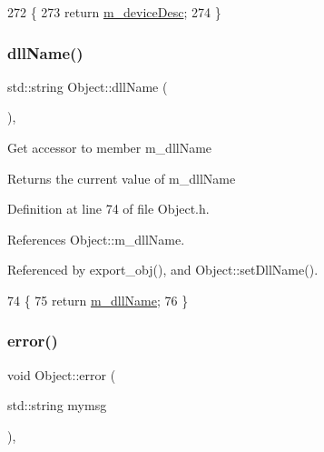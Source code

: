 \begin{DoxyCode}
272                           \{
273     \textcolor{keywordflow}{return} \hyperlink{classUsbFTInterface_a500067688c32cdb3719fecf128e88dca}{m\_deviceDesc};
274   \}
\end{DoxyCode}
\mbox{\label{classObject_a2e3947f2870094c332d7454117f3ec63}} 
\subsubsection{\texorpdfstring{dll\+Name()}{dllName()}}
{\footnotesize\ttfamily std\+::string Object\+::dll\+Name (\begin{DoxyParamCaption}{ }\end{DoxyParamCaption})\hspace{0.3cm}{\ttfamily [inline]}, {\ttfamily [inherited]}}

Get accessor to member m\+\_\+dll\+Name \begin{DoxyReturn}{Returns}
the current value of m\+\_\+dll\+Name 
\end{DoxyReturn}


Definition at line 74 of file Object.\+h.



References Object\+::m\+\_\+dll\+Name.



Referenced by export\+\_\+obj(), and Object\+::set\+Dll\+Name().


\begin{DoxyCode}
74                        \{
75     \textcolor{keywordflow}{return} \hyperlink{classObject_a01afbeacebb8db6831559972ec362eb3}{m\_dllName};
76   \}  
\end{DoxyCode}
\mbox{\label{classObject_a204a95f57818c0f811933917a30eff45}} 
\subsubsection{\texorpdfstring{error()}{error()}\hspace{0.1cm}{\footnotesize\ttfamily [1/2]}}
{\footnotesize\ttfamily void Object\+::error (\begin{DoxyParamCaption}\item[{std\+::string}]{mymsg }\end{DoxyParamCaption})\hspace{0.3cm}{\ttfamily [inline]}, {\ttfamily [inherited]}}



